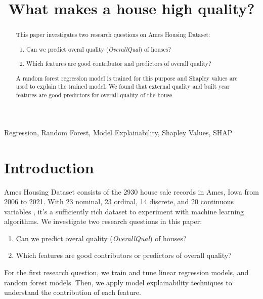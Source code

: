 \documentclass[conference]{IEEEtran}
\begin{document}

\title{What makes a house high quality?\\ }

\author{
}


\maketitle

\begin{abstract}
This paper investigates two research questions on Ames Housing Dataset:
\begin{enumerate}
    \item Can we predict overal quality (\textit{OverallQual}) of houses?
    \item Which features are good contributor and predictors of overall quality? 
\end{enumerate}
A random forest regression model is trained for this purpose and Shapley values
are used to explain the trained model. We found that external quality and built year features are
good predictors for overall quality of the house.\\

\end{abstract}

\begin{IEEEkeywords}
Regression, Random Forest, Model Explainability, Shapley Values, SHAP
\end{IEEEkeywords}

\section{Introduction}

Ames Housing Dataset \cite{DeCock2011} consists of the 2930 house sale records in Ames, Iowa from 2006 to 2021.
With 23 nominal, 23 ordinal, 14 discrete, and 20 continuous variables \cite{DeCock2011}, 
it's a sufficiently rich dataset to experiment with machine learning algorithms.
We investigate two research questions in this paper:
\begin{enumerate}
\item Can we predict overal quality (\textit{OverallQual}) of houses?
\item Which features are good contributors or predictors of overall quality? 
\end{enumerate}
For the first research question, we train and tune linear regression models, and random forest models.
Then, we apply model explainability techniques to understand the contribution of each feature.
\end{document}
